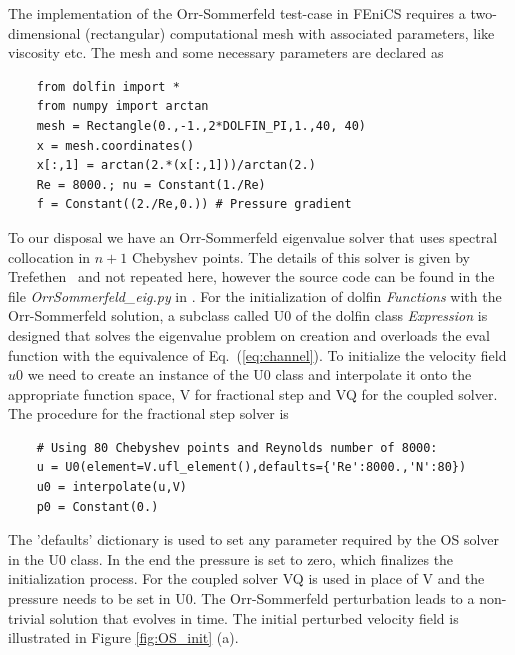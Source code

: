 The implementation of the Orr-Sommerfeld test-case in FEniCS requires a two-dimensional (rectangular) computational mesh with associated parameters, like viscosity etc. The  mesh and some necessary parameters are declared as
\begin{small}
\begin{verbatim}
    from dolfin import *
    from numpy import arctan
    mesh = Rectangle(0.,-1.,2*DOLFIN_PI,1.,40, 40)
    x = mesh.coordinates()
    x[:,1] = arctan(2.*(x[:,1]))/arctan(2.)
    Re = 8000.; nu = Constant(1./Re)
    f = Constant((2./Re,0.)) # Pressure gradient
\end{verbatim}
\end{small}
To our disposal we have an Orr-Sommerfeld eigenvalue solver that uses spectral collocation in $n+1$ Chebyshev points. The details of this solver is given by Trefethen~\cite{tref06} and not repeated here, however the source code can be found in the file \emph{OrrSommerfeld\_eig.py} in \cite{folder}. For the initialization of dolfin \emph{Functions} with the Orr-Sommerfeld solution, a subclass called U0 of the dolfin class \emph{Expression} is designed that solves the eigenvalue problem on creation and overloads the eval function with the equivalence of Eq.~(\ref{eq:channel}). To initialize the velocity field $u0$ we need to create an instance of the U0 class and interpolate it onto the appropriate function space, V for fractional step and VQ for the coupled solver. The procedure for the fractional step solver is
\begin{small}
\begin{verbatim}
    # Using 80 Chebyshev points and Reynolds number of 8000:
    u = U0(element=V.ufl_element(),defaults={'Re':8000.,'N':80}) 
    u0 = interpolate(u,V)
    p0 = Constant(0.)
\end{verbatim}
\end{small}
The 'defaults' dictionary is used to set any parameter required by the OS solver in the U0 class. In the end the pressure is set to zero, which finalizes the initialization process. For the coupled solver VQ is used in place of V and the pressure needs to be set in U0. The Orr-Sommerfeld perturbation leads to a non-trivial solution that evolves in time. The initial perturbed velocity field is illustrated in Figure \ref{fig:OS_init} (a).
